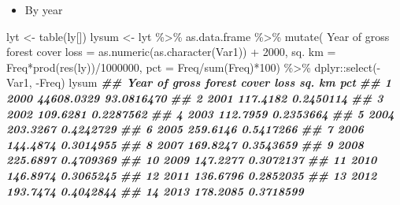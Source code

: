 \documentclass[10pt,landscape,a3paper]{article}
\newenvironment{Shaded}{\begin{snugshade}}{\end{snugshade}}
\newcommand{\AttributeTok}[1]{\textcolor[rgb]{0.77,0.63,0.00}{#1}}
\newcommand{\DecValTok}[1]{\textcolor[rgb]{0.00,0.00,0.81}{#1}}
\newcommand{\DocumentationTok}[1]{\textcolor[rgb]{0.56,0.35,0.01}{\textbf{\textit{#1}}}}
\newcommand{\FunctionTok}[1]{\textcolor[rgb]{0.00,0.00,0.00}{#1}}
\newcommand{\NormalTok}[1]{#1}
\newcommand{\OtherTok}[1]{\textcolor[rgb]{0.56,0.35,0.01}{#1}}
\newcommand{\SpecialCharTok}[1]{\textcolor[rgb]{0.00,0.00,0.00}{#1}}
\newcommand{\StringTok}[1]{\textcolor[rgb]{0.31,0.60,0.02}{#1}}
\providecommand{\tightlist}{%
\setlength{\itemsep}{0pt}\setlength{\parskip}{0pt}}
\begin{document}
\begin{itemize}
\tightlist
\item
  By year
\end{itemize}

\begin{Shaded}
\begin{Highlighting}[]
\NormalTok{lyt }\OtherTok{\textless{}{-}} \FunctionTok{table}\NormalTok{(ly[])}
\NormalTok{lysum }\OtherTok{\textless{}{-}}\NormalTok{ lyt }\SpecialCharTok{\%\textgreater{}\%}\NormalTok{ as.data.frame }\SpecialCharTok{\%\textgreater{}\%}
  \FunctionTok{mutate}\NormalTok{(}
    \StringTok{\textasciigrave{}}\AttributeTok{Year of gross forest cover loss}\StringTok{\textasciigrave{}} \OtherTok{=} \FunctionTok{as.numeric}\NormalTok{(}\FunctionTok{as.character}\NormalTok{(Var1)) }\SpecialCharTok{+} \DecValTok{2000}\NormalTok{,}
    \StringTok{\textasciigrave{}}\AttributeTok{sq. km}\StringTok{\textasciigrave{}} \OtherTok{=}\NormalTok{ Freq}\SpecialCharTok{*}\FunctionTok{prod}\NormalTok{(}\FunctionTok{res}\NormalTok{(ly))}\SpecialCharTok{/}\DecValTok{1000000}\NormalTok{,}
    \AttributeTok{pct =}\NormalTok{ Freq}\SpecialCharTok{/}\FunctionTok{sum}\NormalTok{(Freq)}\SpecialCharTok{*}\DecValTok{100}\NormalTok{) }\SpecialCharTok{\%\textgreater{}\%}
\NormalTok{  dplyr}\SpecialCharTok{::}\FunctionTok{select}\NormalTok{(}\SpecialCharTok{{-}}\NormalTok{Var1, }\SpecialCharTok{{-}}\NormalTok{Freq)}
\NormalTok{lysum}
\DocumentationTok{\#\#    Year of gross forest cover loss     sq. km        pct}
\DocumentationTok{\#\# 1                             2000 44608.0329 93.0816470}
\DocumentationTok{\#\# 2                             2001   117.4182  0.2450114}
\DocumentationTok{\#\# 3                             2002   109.6281  0.2287562}
\DocumentationTok{\#\# 4                             2003   112.7959  0.2353664}
\DocumentationTok{\#\# 5                             2004   203.3267  0.4242729}
\DocumentationTok{\#\# 6                             2005   259.6146  0.5417266}
\DocumentationTok{\#\# 7                             2006   144.4874  0.3014955}
\DocumentationTok{\#\# 8                             2007   169.8247  0.3543659}
\DocumentationTok{\#\# 9                             2008   225.6897  0.4709369}
\DocumentationTok{\#\# 10                            2009   147.2277  0.3072137}
\DocumentationTok{\#\# 11                            2010   146.8974  0.3065245}
\DocumentationTok{\#\# 12                            2011   136.6796  0.2852035}
\DocumentationTok{\#\# 13                            2012   193.7474  0.4042844}
\DocumentationTok{\#\# 14                            2013   178.2085  0.3718599}

\end{Highlighting}
\end{Shaded}
\end{document}
